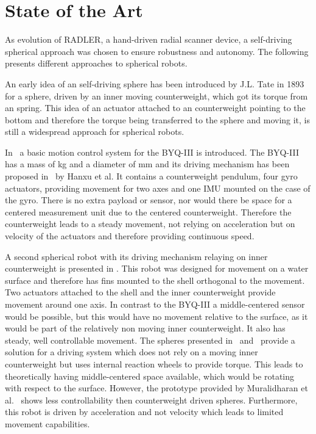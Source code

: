 \section{State of the Art}
\label{sec:stateOfTheArt}
As evolution of RADLER, a hand-driven radial scanner device, a self-driving spherical approach was chosen to ensure robustness and autonomy.
The following presents different approaches to spherical robots.

An early idea of an self-driving sphere has been introduced by J.L. Tate in 1893 \cite{tate1893sphere} for a sphere, driven by an inner moving counterweight, which got its torque from an spring.
This idea of an actuator attached to an counterweight pointing to the bottom and therefore the torque being transferred to the sphere and moving it, is still a widespread approach for spherical robots.

In~\cite{soa1} a basic motion control system for the BYQ-III is introduced.
The BYQ-III has a mass of \unit[25]{kg} and a diameter of \unit[600]{mm} and its driving mechanism has been proposed in~\cite{soa2} by Hanxu et al.
It contains  a counterweight pendulum, four gyro actuators, providing movement for two axes and one IMU mounted on the case of the gyro.
There is no extra payload or sensor, nor would there be space for a centered measurement unit due to the centered counterweight.
Therefore the counterweight leads to a steady movement, not relying on acceleration but on velocity of the actuators and therefore providing continuous speed.

A second spherical robot with its driving mechanism relaying on inner counterweight is presented in \cite{soa3}.
This robot was designed for movement on a water surface and therefore has fins mounted to the shell orthogonal to the movement.
Two actuators attached to the shell and the inner counterweight provide movement around one axis.
In contrast to the BYQ-III a middle-centered sensor would be possible, but this would have no movement relative to the surface, as it would be part of the relatively non moving inner counterweight.
It also has steady, well controllable movement. 
The spheres presented in~\cite{soa4} and~\cite{soa5} provide a solution for a driving system which does not rely on a moving inner counterweight but uses internal reaction wheels to provide torque.
This leads to theoretically having middle-centered space available, which would be rotating with respect to the surface.
However, the prototype provided by Muralidharan et al.~\cite{soa4} shows less controllability then counterweight driven spheres. Furthermore, this robot is driven by acceleration and not velocity which leads to limited movement capabilities.

